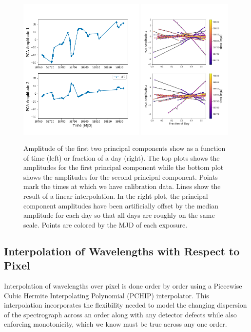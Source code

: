 \documentclass[twocolumn]{aastex63}
\begin{document}
\begin{figure}[h!]
\centering
\includegraphics[width=0.56\textwidth]{Figures/pcA_lfc.png}
\includegraphics[width=0.42\textwidth]{Figures/pcAs_byDay.png}
\caption{Amplitude of the first two principal components show as a function of time (left) or fraction of a day (right).  The top plots shows the amplitudes for the first principal component while the bottom plot shows the amplitudes for the second principal component.  Points mark the times at which we have calibration data.  Lines show the result of a linear interpolation.  In the right plot, the principal component amplitudes have been artificially offset by the median amplitude for each day so that all days are roughly on the same scale.  Points are colored by the MJD of each exposure.}
\label{fig:nightlyVariation}
\end{figure} 

\subsection{Interpolation of Wavelengths with Respect to Pixel}
Interpolation of wavelengths over pixel  is done order by order using a Piecewise Cubic Hermite Interpolating Polynomial (PCHIP) interpolator.  This interpolation incorporates the flexibility needed to model the changing dispersion of the spectrograph across an order along with any detector defects while also enforcing monotonicity, which we know must be true across any one order.
\end{document}
